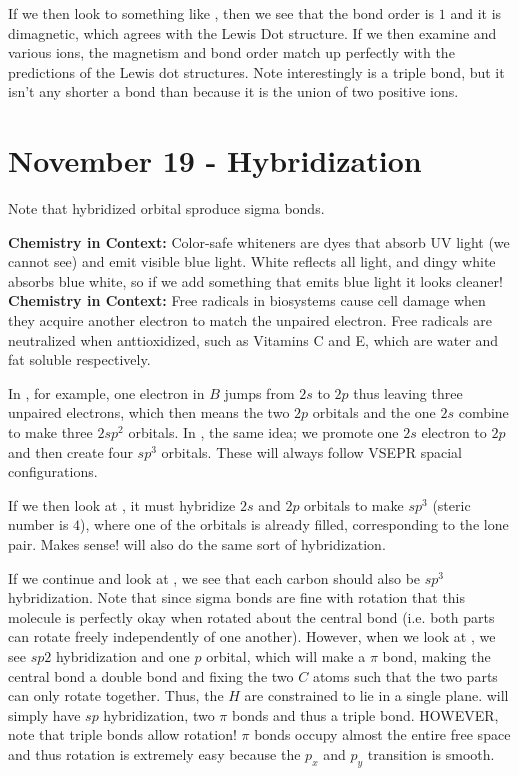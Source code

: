 \documentclass{report}
\begin{document}
If we then look to something like , then we see that the bond order is $1$ and it is dimagnetic, which agrees with the Lewis Dot structure. If we then examine  and various ions, the magnetism and bond order match up perfectly with the predictions of the Lewis dot structures. Note interestingly  is a triple bond, but it isn't any shorter a bond than  because it is the union of two positive ions. 

\chapter{November 19 - Hybridization}

Note that hybridized orbital sproduce sigma bonds.

\begin{center}
\textbf{Chemistry in Context: }Color-safe whiteners are dyes that absorb UV light (we cannot see) and emit visible blue light. White reflects all light, and dingy white absorbs blue white, so if we add something that emits blue light it looks cleaner!
\textbf{Chemistry in Context: }Free radicals in biosystems cause cell damage when they acquire another electron to match the unpaired electron. Free radicals are neutralized when anttioxidized, such as Vitamins C and E, which are water and fat soluble respectively.
\end{center}

In , for example, one electron in $B$ jumps from $2s$ to $2p$ thus leaving three unpaired electrons, which then means the two $2p$ orbitals and the one $2s$ combine to make three $2sp^2$ orbitals. In , the same idea; we promote one $2s$ electron to $2p$ and then create four $sp^3$ orbitals. These will always follow VSEPR spacial configurations.

If we then look at , it must hybridize $2s$ and $2p$ orbitals to make $sp^3$ (steric number is $4$), where one of the orbitals is already filled, corresponding to the lone pair. Makes sense!  will also do the same sort of hybridization.

If we continue and look at , we see that each carbon should also be $sp^3$ hybridization. Note that since sigma bonds are fine with rotation that this molecule is perfectly okay when rotated about the central bond (i.e. both parts can rotate freely independently of one another). However, when we look at , we see $sp2$ hybridization and one $p$ orbital, which will make a $\pi$ bond, making the central bond a double bond and fixing the two $C$ atoms such that the two parts can only rotate together. Thus, the $H$ are constrained to lie in a single plane.  will simply have $sp$ hybridization, two $\pi$ bonds and thus a triple bond. HOWEVER, note that triple bonds allow rotation! $\pi$ bonds occupy almost the entire free space and thus rotation is extremely easy because the $p_x$ and $p_y$ transition is smooth. 
\end{document}
